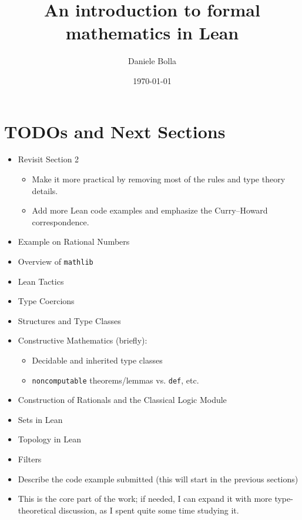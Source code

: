 \documentclass{article}
\title{An introduction to formal mathematics in Lean}
\author{Daniele Bolla}
\date{\today}
\numberwithin{figure}{theorem}
\begin{document}
\tableofcontents




\section{TODOs and Next Sections}

\begin{itemize}
    \item Revisit Section 2
          \begin{itemize}
              \item Make it more practical by removing most of the rules and type theory details.
              \item Add more Lean code examples and emphasize the Curry–Howard correspondence.
          \end{itemize}
    \item Example on Rational Numbers
    \item Overview of \texttt{mathlib}
    \item Lean Tactics
    \item Type Coercions
    \item Structures and Type Classes
    \item Constructive Mathematics (briefly):
          \begin{itemize}
              \item Decidable and inherited type classes
              \item \texttt{noncomputable} theorems/lemmas vs. \texttt{def}, etc.
          \end{itemize}
    \item Construction of Rationals and the Classical Logic Module
    \item Sets in Lean
    \item Topology in Lean
    \item Filters
    \item Describe the code example submitted  (this will start in the previous sections)
    \item This is the core part of the work; if needed, I can expand it with more
          type-theoretical discussion, as I spent quite some time studying it.
\end{itemize}

% 
% 
% 
%   
%   
% 
% 
\end{document}
